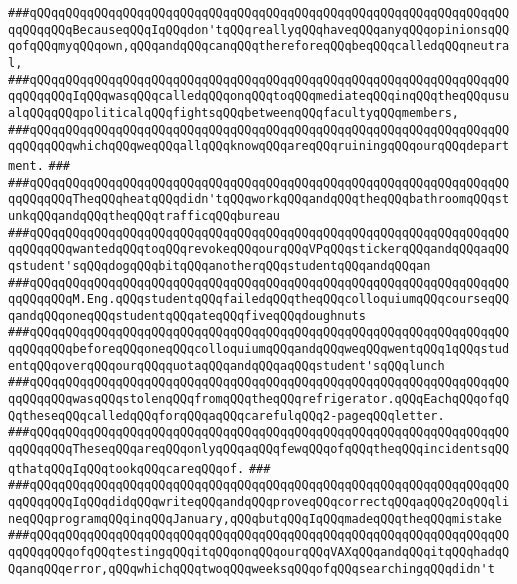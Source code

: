 \verb|###qQQqqQQqqQQqqQQqqQQqqQQqqQQqqQQqqQQqqQQqqQQqqQQqqQQqqQQqqQQqqQQqqQQqqQQqqQQqBecauseqQQqIqQQqdon'tqQQqreallyqQQqhaveqQQqanyqQQqopinionsqQQqofqQQqmyqQQqown,qQQqandqQQqcanqQQqthereforeqQQqbeqQQqcalledqQQqneutral,|\newline
\verb|###qQQqqQQqqQQqqQQqqQQqqQQqqQQqqQQqqQQqqQQqqQQqqQQqqQQqqQQqqQQqqQQqqQQqqQQqqQQqIqQQqwasqQQqcalledqQQqonqQQqtoqQQqmediateqQQqinqQQqtheqQQqusualqQQqqQQqpoliticalqQQqfightsqQQqbetweenqQQqfacultyqQQqmembers,|\newline
\verb|###qQQqqQQqqQQqqQQqqQQqqQQqqQQqqQQqqQQqqQQqqQQqqQQqqQQqqQQqqQQqqQQqqQQqqQQqqQQqwhichqQQqweqQQqallqQQqknowqQQqareqQQqruiningqQQqourqQQqdepartment.|\newline
\verb|###|\newline
\verb|###qQQqqQQqqQQqqQQqqQQqqQQqqQQqqQQqqQQqqQQqqQQqqQQqqQQqqQQqqQQqqQQqqQQqqQQqqQQqTheqQQqheatqQQqdidn'tqQQqworkqQQqandqQQqtheqQQqbathroomqQQqstunkqQQqandqQQqtheqQQqtrafficqQQqbureau|\newline
\verb|###qQQqqQQqqQQqqQQqqQQqqQQqqQQqqQQqqQQqqQQqqQQqqQQqqQQqqQQqqQQqqQQqqQQqqQQqqQQqwantedqQQqtoqQQqrevokeqQQqourqQQqVPqQQqstickerqQQqandqQQqaqQQqstudent'sqQQqdogqQQqbitqQQqanotherqQQqstudentqQQqandqQQqan|\newline
\verb|###qQQqqQQqqQQqqQQqqQQqqQQqqQQqqQQqqQQqqQQqqQQqqQQqqQQqqQQqqQQqqQQqqQQqqQQqqQQqM.Eng.qQQqstudentqQQqfailedqQQqtheqQQqcolloquiumqQQqcourseqQQqandqQQqoneqQQqstudentqQQqateqQQqfiveqQQqdoughnuts|\newline
\verb|###qQQqqQQqqQQqqQQqqQQqqQQqqQQqqQQqqQQqqQQqqQQqqQQqqQQqqQQqqQQqqQQqqQQqqQQqqQQqbeforeqQQqoneqQQqcolloquiumqQQqandqQQqweqQQqwentqQQq1qQQqstudentqQQqoverqQQqourqQQqquotaqQQqandqQQqaqQQqstudent'sqQQqlunch|\newline
\verb|###qQQqqQQqqQQqqQQqqQQqqQQqqQQqqQQqqQQqqQQqqQQqqQQqqQQqqQQqqQQqqQQqqQQqqQQqqQQqwasqQQqstolenqQQqfromqQQqtheqQQqrefrigerator.qQQqEachqQQqofqQQqtheseqQQqcalledqQQqforqQQqaqQQqcarefulqQQq2-pageqQQqletter.|\newline
\verb|###qQQqqQQqqQQqqQQqqQQqqQQqqQQqqQQqqQQqqQQqqQQqqQQqqQQqqQQqqQQqqQQqqQQqqQQqqQQqTheseqQQqareqQQqonlyqQQqaqQQqfewqQQqofqQQqtheqQQqincidentsqQQqthatqQQqIqQQqtookqQQqcareqQQqof.|\newline
\verb|###|\newline
\verb|###qQQqqQQqqQQqqQQqqQQqqQQqqQQqqQQqqQQqqQQqqQQqqQQqqQQqqQQqqQQqqQQqqQQqqQQqqQQqIqQQqdidqQQqwriteqQQqandqQQqproveqQQqcorrectqQQqaqQQq2OqQQqlineqQQqprogramqQQqinqQQqJanuary,qQQqbutqQQqIqQQqmadeqQQqtheqQQqmistake|\newline
\verb|###qQQqqQQqqQQqqQQqqQQqqQQqqQQqqQQqqQQqqQQqqQQqqQQqqQQqqQQqqQQqqQQqqQQqqQQqqQQqofqQQqtestingqQQqitqQQqonqQQqourqQQqVAXqQQqandqQQqitqQQqhadqQQqanqQQqerror,qQQqwhichqQQqtwoqQQqweeksqQQqofqQQqsearchingqQQqdidn't|\newline
